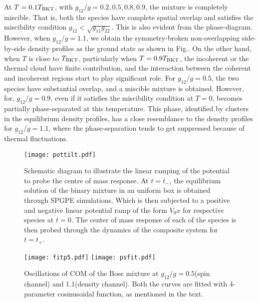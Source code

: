 \documentclass[pra,twocolumn,aps,showpacs,longbibliography]{revtex4-1}
\begin{document}
At $T=0.1 T_{\rm BKT}$, with $g_{12}/g = 0.2, 0.5, 0.8, 0.9$, the mixture is completely miscible.
That is, both the species have complete spatial overlap and satisfies the miscibility
condition $g_{12}<\sqrt{g_{11}g_{22}}$. This is also evident from the phase-diagram. 
However, when $g_{12}/g = 1.1$, we obtain the symmetry-broken 
non-overlapping side-by-side density profiles as the ground 
state as shown in Fig.. 
On the other hand, when $T$ is close to $T_{\rm BKT}$, particularly when $T=0.9 T_{\rm BKT}$,
the incoherent or the thermal cloud have finite contribution, and the interaction
between the coherent and incoherent regions start to play significant role. For $g_{12}/g = 0.5$,
the two species have substantial overlap, and a miscible mixture is obtained. However, for,
$g_{12}/g = 0.9$, even if it satisfies the miscibility condition at $T=0$, becomes
partially phase-separated at this temperature. This phase, identified by clusters in the
equilibrium density profiles, has a close resemblance to the density profiles for $g_{12}/g = 1.1$,
where the phase-separation tends to get suppressed because of thermal fluctuations.

\begin{figure}
	\texttt{[image: pottilt.pdf]}
	\caption{Schematic diagram to illustrate the linear ramping of the potential to
	  probe the centre of mass response. At $t=t_-$, the equilibrium solution of the binary
	  mixture in an uniform box is obtained through SPGPE simulations. Which is 
	  then subjected to a positive and negative linear potential ramp of the form $V_0 x$ 
	  for respective species at $t=0$. The center of mass response of each of the species
	  is then probed through the dynamics of the composite system for $t=t_+$.
	  }
	\label{pottilt}
\end{figure}

\begin{figure}
  \texttt{[image: fitp5.pdf]}
  \texttt{[image: psfit.pdf]}
	\caption{Oscillations of COM of the Bose mixture at $g_{12}/g = 0.5$(spin channel) 
	and 1.1(density channel). Both the curves are fitted with 4-parameter cosinusoidal
	function, as mentioned in the text.}
         \label{osc}	
\end{figure}
\end{document}
